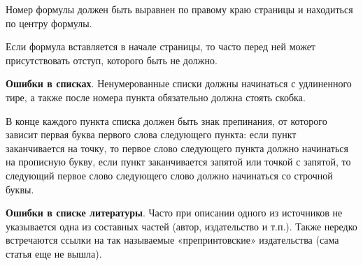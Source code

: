 Номер формулы должен быть выравнен по правому краю страницы и находиться по центру формулы.

Если формула вставляется в начале страницы, то часто перед ней может присутствовать отступ, которого быть не должно.

\textbf{Ошибки в списках}. Ненумерованные списки должны начинаться с удлиненного тире, а также после номера пункта обязательно должна стоять скобка.

В конце каждого пункта списка должен быть знак препинания, от которого зависит первая буква первого слова следующего пункта: если пункт заканчивается на точку, то первое слово следующего пункта должно начинаться на прописную букву, если пункт заканчивается запятой или точкой с запятой, то следующий первое слово следующего слово должно начинаться со строчной буквы.

\textbf{Ошибки в списке литературы}. Часто при описании одного из источников не указывается одна из составных частей (автор, издательство и т.п.). Также нередко встречаются ссылки на так называемые «препринтовские» издательства (сама статья еще не вышла).
